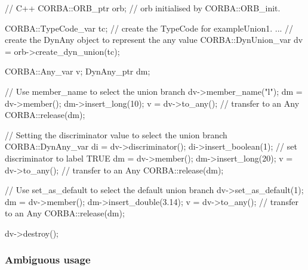 \documentclass[11pt,twoside,a4paper]{book}
\begin{document}
\begin{cxxlisting}
// C++
CORBA::ORB_ptr orb;  // orb initialised by CORBA::ORB_init.
  
CORBA::TypeCode_var tc;
// create the TypeCode for exampleUnion1.
...
// create the DynAny object to represent the any value
CORBA::DynUnion_var dv = orb->create_dyn_union(tc);
  
CORBA::Any_var v;
DynAny_ptr dm;
  
// Use member_name to select the union branch
dv->member_name("l");
dm = dv->member();
dm->insert_long(10);
v = dv->to_any();          // transfer to an Any
CORBA::release(dm);

// Setting the discriminator value to select the union branch
CORBA::DynAny_var di = dv->discriminator();
di->insert_boolean(1);     // set discriminator to label TRUE
dm = dv->member();
dm->insert_long(20);
v = dv->to_any();          // transfer to an Any
CORBA::release(dm);

// Use set_as_default to select the default union branch
dv->set_as_default(1);
dm = dv->member();
dm->insert_double(3.14);
v = dv->to_any();          // transfer to an Any
CORBA::release(dm);

dv->destroy();
\end{cxxlisting}


\subsubsection{Ambiguous usage}
\end{document}
